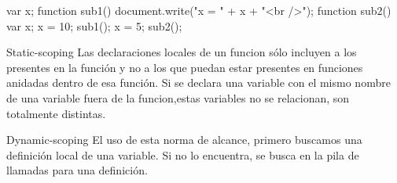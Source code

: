 \documentclass[12pt,oneside]{article}
\begin{document}
var x;
function sub1() {
document.write("x = " + x + "<br />");
}
function sub2() {
var x;
x = 10;
sub1();
}
x = 5;
sub2();

Static-scoping
 Las  declaraciones locales de un funcion sólo incluyen a los presentes en la función y no a los que puedan estar presentes en funciones anidadas  dentro de esa función.
 Si se declara una variable con el mismo nombre de una variable fuera de la funcion,estas variables no se relacionan, son totalmente distintas.

Dynamic-scoping
 El uso de esta norma de alcance, primero buscamos una definición local de una variable. Si no lo encuentra, se busca en la pila de llamadas para una definición.




\end{document}
